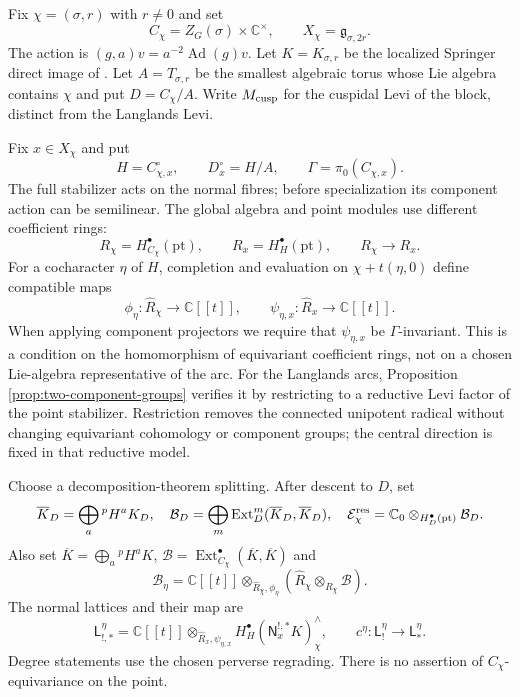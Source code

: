 \documentclass[11pt]{amsart}
\theoremstyle{definition}
\theoremstyle{remark}
\newcommand{\C}{\mathbb C}
\newcommand{\A}{\C[[t]]}
\newcommand{\Ext}{\operatorname{Ext}}
\begin{document}
Fix $\chi=(\sigma,r)$ with $r\ne0$ and set
\[
 C_\chi=Z_G(\sigma)\times\mathbb C^\times,\qquad
 X_\chi=\mathfrak g_{\sigma,2r}.
\]
The action is $(g,a)v=a^{-2}\operatorname{Ad}(g)v$.
Let $K=K_{\sigma,r}$ be the localized Springer direct image of
\cite[equations~(2.11)--(2.14)]{Solleveld}.  Let $A=T_{\sigma,r}$ be the
smallest algebraic torus whose Lie algebra contains $\chi$ and put
$D=C_\chi/A$.  Write $M_{\rm cusp}$ for the cuspidal Levi of the block,
distinct from the Langlands Levi.

Fix $x\in X_\chi$ and put
\[
 H=C_{\chi,x}^{\circ},\qquad D_x^\circ=H/A,\qquad
 \Gamma=\pi_0(C_{\chi,x}).
\]
The full stabilizer acts on the normal fibres; before specialization
its component action can be semilinear.
The global algebra and point modules use different coefficient rings:
\[
 R_\chi=H_{C_\chi}^\bullet(\mathrm{pt}),\qquad
 R_x=H_H^\bullet(\mathrm{pt}),\qquad R_\chi\longrightarrow R_x.
\]
For a cocharacter $\eta$ of $H$, completion and evaluation on
$\chi+t(\eta,0)$ define compatible maps
\[
 \phi_\eta:\widehat R_\chi\longrightarrow\A,\qquad
 \psi_{\eta,x}:\widehat R_x\longrightarrow\A.
\]
When applying component projectors we require that $\psi_{\eta,x}$
be $\Gamma$-invariant.  This is a condition on the homomorphism of
equivariant coefficient rings, not on a chosen Lie-algebra representative
of the arc.  For the Langlands arcs, Proposition
\ref{prop:two-component-groups} verifies it by restricting to a reductive
Levi factor of the point stabilizer.  Restriction removes the connected
unipotent radical without changing equivariant cohomology or component
groups; the central direction is fixed in that reductive model.

Choose a decomposition-theorem splitting.  After descent to $D$, set
\[
 \overline K_D=\bigoplus_a{}^pH^aK_D,\quad
 \mathcal B_D=\bigoplus_m\Ext_D^m(\overline K_D,\overline K_D),\quad
 \mathcal E_\chi^{\rm res}
 =\mathbb C_0\otimes_{H_D^\bullet(\mathrm{pt})}\mathcal B_D.
\]
Also set $\overline K=\bigoplus_a{}^pH^aK$,
$\mathcal B=\Ext^\bullet_{C_\chi}(\overline K,\overline K)$ and
\[
 \mathcal B_\eta=\A\otimes_{\widehat R_\chi,\phi_\eta}
       (\widehat R_\chi\otimes_{R_\chi}\mathcal B).
\]
The normal lattices and their map are
\begin{equation}\label{eq:normal-arc-lattices}
 \mathsf L_{!,*}^{\eta}
 =\A\otimes_{\widehat R_x,\psi_{\eta,x}}
   H_H^\bullet(\mathsf N_x^{!,*}K)^\wedge_\chi,\qquad
 c^\eta:\mathsf L_!^\eta\longrightarrow\mathsf L_*^\eta.
\end{equation}
Degree statements use the chosen perverse regrading.  There is no
assertion of $C_\chi$-equivariance on the point.
\end{document}
